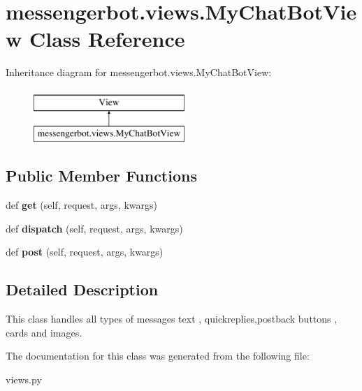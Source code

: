 \hypertarget{classmessengerbot_1_1views_1_1MyChatBotView}{}\section{messengerbot.\+views.\+My\+Chat\+Bot\+View Class Reference}
\label{classmessengerbot_1_1views_1_1MyChatBotView}
Inheritance diagram for messengerbot.\+views.\+My\+Chat\+Bot\+View\+:\begin{figure}[H]
\begin{center}
\leavevmode
\includegraphics[height=2.000000cm]{classmessengerbot_1_1views_1_1MyChatBotView}
\end{center}
\end{figure}
\subsection*{Public Member Functions}
\begin{DoxyCompactItemize}
\item 
\mbox{\label{classmessengerbot_1_1views_1_1MyChatBotView_a3023bcfc14b0a4a963d47ec01af604ad}} 
def {\bfseries get} (self, request, args, kwargs)
\item 
\mbox{\label{classmessengerbot_1_1views_1_1MyChatBotView_a046fb0cd8f4598904864633b1b76a0b8}} 
def {\bfseries dispatch} (self, request, args, kwargs)
\item 
\mbox{\label{classmessengerbot_1_1views_1_1MyChatBotView_a60402a8e54abc2020a4ca63b84506b9a}} 
def {\bfseries post} (self, request, args, kwargs)
\end{DoxyCompactItemize}


\subsection{Detailed Description}
\begin{DoxyVerb}This class handles all types of messages text , quickreplies,postback buttons , cards and images.
\end{DoxyVerb}
 

The documentation for this class was generated from the following file\+:\begin{DoxyCompactItemize}
\item 
views.\+py\end{DoxyCompactItemize}
